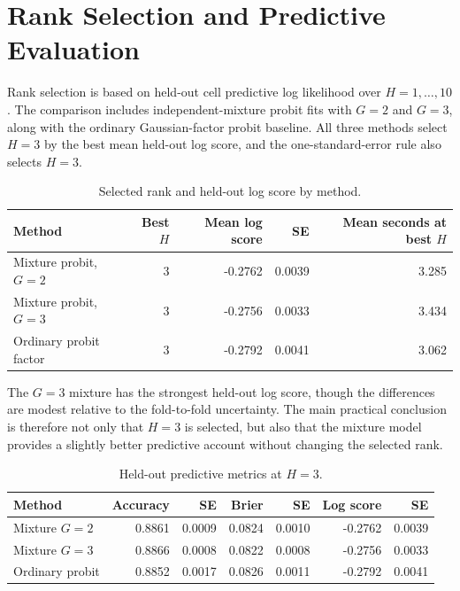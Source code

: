 \documentclass[11pt]{article}
\begin{document}
\section{Rank Selection and Predictive Evaluation}

Rank selection is based on held-out cell predictive log likelihood over $H=1,\ldots,10$. The
comparison includes independent-mixture probit fits with $G=2$ and $G=3$, along with the ordinary
Gaussian-factor probit baseline. All three methods select $H=3$ by the best mean held-out log
score, and the one-standard-error rule also selects $H=3$.

\begin{table}[h]
\centering
\caption{Selected rank and held-out log score by method.}
\label{tab:rank-selection}
\begin{tabular}{lrrrr}
\toprule
Method & Best $H$ & Mean log score & SE & Mean seconds at best $H$ \\
\midrule
Mixture probit, $G=2$ & 3 & -0.2762 & 0.0039 & 3.285 \\
Mixture probit, $G=3$ & 3 & -0.2756 & 0.0033 & 3.434 \\
Ordinary probit factor & 3 & -0.2792 & 0.0041 & 3.062 \\
\bottomrule
\end{tabular}
\end{table}

The $G=3$ mixture has the strongest held-out log score, though the differences are modest relative
to the fold-to-fold uncertainty. The main practical conclusion is therefore not only that $H=3$
is selected, but also that the mixture model provides a slightly better predictive account without
changing the selected rank.

\begin{table}[h]
\centering
\caption{Held-out predictive metrics at $H=3$.}
\label{tab:predictive-metrics}
\begin{tabular}{lrrrrrr}
\toprule
Method & Accuracy & SE & Brier & SE & Log score & SE \\
\midrule
Mixture $G=2$ & 0.8861 & 0.0009 & 0.0824 & 0.0010 & -0.2762 & 0.0039 \\
Mixture $G=3$ & 0.8866 & 0.0008 & 0.0822 & 0.0008 & -0.2756 & 0.0033 \\
Ordinary probit & 0.8852 & 0.0017 & 0.0826 & 0.0011 & -0.2792 & 0.0041 \\
\bottomrule
\end{tabular}
\end{table}
\end{document}
